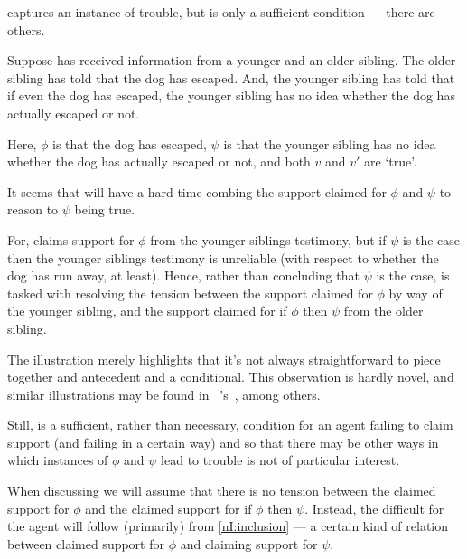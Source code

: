 \begin{note}
  \nI{} captures an instance of trouble, but is only a sufficient condition --- there are others.

  \begin{illustration}
    Suppose  has received information from a younger and an older sibling.
    The older sibling has told  that the dog has escaped.
    And, the younger sibling has told  that if even the dog has escaped, the younger sibling has no idea whether the dog has actually escaped or not.
  \end{illustration}

  Here, \(\phi\) is that the dog has escaped, \(\psi\) is that the younger sibling has no idea whether the dog has actually escaped or not, and both \(v\) and \(v'\) are `true'.

  It seems that  will have a hard time combing the support claimed for \(\phi\) and \(\psi\) to reason to \(\psi\) being true.

  For,  claims support for \(\phi\) from the younger siblings testimony, but if \(\psi\) is the case then the younger siblings testimony is unreliable (with respect to whether the dog has run away, at least).
  Hence, rather than concluding that \(\psi\) is the case,  is tasked with resolving the tension between the support claimed for \(\phi\) by way of the younger sibling, and the support claimed for if \(\phi\) then \(\psi\) from the older sibling.

  The illustration merely highlights that it's not always straightforward to piece together and antecedent and a conditional.
  This observation is hardly novel, and similar illustrations may be found in ~\citeauthor{Harman:1986ux}'s~, among others.

  Still, \nI{} is a sufficient, rather than necessary, condition for an agent failing to claim support (and failing in a certain way) and so that there may be other ways in which instances of \(\phi\) and \(\psi\) lead to trouble is not of particular interest.

  When discussing \nI{} we will assume that there is no tension between the claimed support for \(\phi\) and the claimed support for if \(\phi\) then \(\psi\).
  Instead, the difficult for the agent will follow (primarily) from \ref{nI:inclusion} --- a certain kind of relation between claimed support for \(\phi\) and claiming support for \(\psi\).
\end{note}

